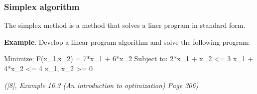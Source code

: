 \documentclass[11pt]{article}
\newenvironment{Shaded}{}{}
\newcommand{\NormalTok}[1]{{#1}}
\begin{document}
\subsubsection{Simplex algorithm}\label{simplex-algorithm}

The simplex method is a method that solves a liner program in standard
form.

\textbf{Example}. Develop a linear program algorithm and solve the
following program:

\begin{Shaded}
\begin{Highlighting}[]
\NormalTok{  Minimize:}
\NormalTok{          F(x\_1,x\_2) = 7*x\_1 + 6*x\_2}
\NormalTok{  Subject to:}
\NormalTok{         2*x\_1 + x\_2 \textless{}= 3}
\NormalTok{         x\_1 + 4*x\_2 \textless{}= 4}
\NormalTok{            x\_1, x\_2 \textgreater{}= 0}
\end{Highlighting}
\end{Shaded}

\emph{({[}8{]}, Example 16.3 (An introduction to optimization) Page
306)}
\end{document}

